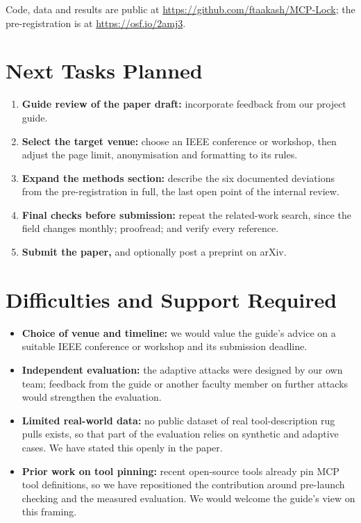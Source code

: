 \documentclass[11pt,a4paper]{article}
\begin{document}
Code, data and results are public at \url{https://github.com/ftaakash/MCP-Lock}; the pre-registration is at
\url{https://osf.io/2amj3}.

\section{Next Tasks Planned}
\begin{enumerate}
  \item \textbf{Guide review of the paper draft:} incorporate feedback from our project guide.
  \item \textbf{Select the target venue:} choose an IEEE conference or workshop, then adjust the page limit,
        anonymisation and formatting to its rules.
  \item \textbf{Expand the methods section:} describe the six documented deviations from the pre-registration in
        full, the last open point of the internal review.
  \item \textbf{Final checks before submission:} repeat the related-work search, since the field changes
        monthly; proofread; and verify every reference.
  \item \textbf{Submit the paper,} and optionally post a preprint on arXiv.
\end{enumerate}

\section{Difficulties and Support Required}
\begin{itemize}
  \item \textbf{Choice of venue and timeline:} we would value the guide's advice on a suitable IEEE conference or
        workshop and its submission deadline.
  \item \textbf{Independent evaluation:} the adaptive attacks were designed by our own team; feedback from the guide
        or another faculty member on further attacks would strengthen the evaluation.
  \item \textbf{Limited real-world data:} no public dataset of real tool-description rug pulls exists, so that part
        of the evaluation relies on synthetic and adaptive cases. We have stated this openly in the paper.
  \item \textbf{Prior work on tool pinning:} recent open-source tools already pin MCP tool definitions, so we have
        repositioned the contribution around pre-launch checking and the measured evaluation. We would welcome the
        guide's view on this framing.
\end{itemize}
\end{document}
